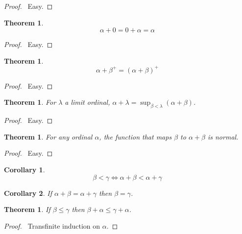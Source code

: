 \documentclass{article}
\let\qed\relax
\newtheorem{theorem}[axiom]{Theorem}
\newtheorem{corollary}{Corollary}[axiom]
\theoremstyle{definition}
\begin{document}
    \begin{proof}
        \pf\ Easy. \qed
    \end{proof}

    \begin{theorem}
        \[ \alpha + 0 = 0 + \alpha = \alpha \]
    \end{theorem}

    \begin{proof}
        \pf\ Easy. \qed
    \end{proof}

    \begin{theorem}
        \[ \alpha + \beta^+ = (\alpha + \beta)^+ \]
    \end{theorem}

    \begin{proof}
        \pf\ Easy. \qed
    \end{proof}

    \begin{theorem}
        For $\lambda$ a limit ordinal, $\alpha + \lambda = \sup_{\beta < \lambda} (\alpha + \beta)$.
    \end{theorem}

    \begin{proof}
        \pf\ Easy. \qed
    \end{proof}

    \begin{theorem}
        For any ordinal $\alpha$, the function that maps $\beta$ to $\alpha + \beta$ is normal.
    \end{theorem}

    \begin{proof}
        \pf\ Easy. \qed
    \end{proof}

    \begin{corollary}
        \[ \beta < \gamma \Leftrightarrow \alpha + \beta < \alpha + \gamma \]
    \end{corollary}

    \begin{corollary}
        If $\alpha + \beta = \alpha + \gamma$ then $\beta = \gamma$.
    \end{corollary}

    \begin{theorem}
        If $\beta \leq \gamma$ then $\beta + \alpha \leq \gamma + \alpha$.
    \end{theorem}

    \begin{proof}
        \pf\ Transfinite induction on $\alpha$. \qed
    \end{proof}
\end{document}
